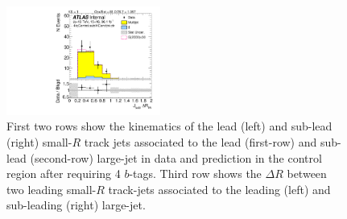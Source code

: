 \begin{figure}[htbp!]
\begin{center}
\includegraphics[width=0.45\textwidth,angle=-90]{figures/boosted/Control/b77_FourTag_Control_sublHCand_trk_dr.pdf}
  \caption{First two rows show the kinematics of the lead (left) and sub-lead (right) small-$R$ track jets associated to the lead (first-row) and sub-lead (second-row) large-\R jet in data and prediction in the control region after requiring 4 $b$-tags. Third row shows the $\Delta R$ between two leading small-$R$ track-jets associated to the leading (left) and sub-leading (right) large-\R jet.  }
  \label{fig:boosted-4b-control-ak2}
\end{center}
\end{figure}


